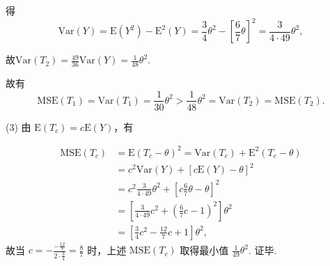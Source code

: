 \begin{example}
    得 
    \[
        \text{Var}(Y)=\text{E}(Y^2)-\text{E}^2(Y)=\frac{3}{4}\theta^2-\left[ \frac{6}{7}\theta \right]^2=\frac{3}{4 \cdot 49}\theta^2,
    \]

    故$ \text{Var}(T_2)=\frac{49}{36}\text{Var}(Y)=\frac{1}{48}\theta^2.$

    故有 
    \[
        \text{MSE}(T_1)=\text{Var}(T_1)=\frac{1}{30}\theta^2>\frac{1}{48}\theta^2=\text{Var}(T_2)=\text{MSE}(T_2).
    \]

    (3) 由 $\text{E}(T_c)=c\text{E}(Y)$，有

    \[
        \begin{aligned} \text{MSE}(T_c)&=\text{E}(T_c-\theta)^2=\text{Var}(T_c)+\text{E}^2(T_c-\theta) \\ &=c^2\text{Var}(Y)+[c\text{E}(Y)-\theta]^2 \\ &=c^2\frac{3}{4 \cdot 49}\theta^2 +[c \frac{6}{7}\theta-\theta]^2 \\ &=\left[ \frac{3}{4 \cdot 49}c^2+ \left( \frac{6}{7}c -1 \right)^2\right] \theta^2 \\ &=\left[ \frac{3}{4}c^2-\frac{12}{7}c+1 \right] \theta^2, \end{aligned} 
    \]
     故当 $c=-\frac{-\frac{12}{7}}{2\cdot\frac{3}{4}}=\frac{8}{7}$ 时，上述 $\text{MSE}(T_c)$ 取得最小值 $\frac{1}{49}\theta^2 $. 证毕.
\end{example}

